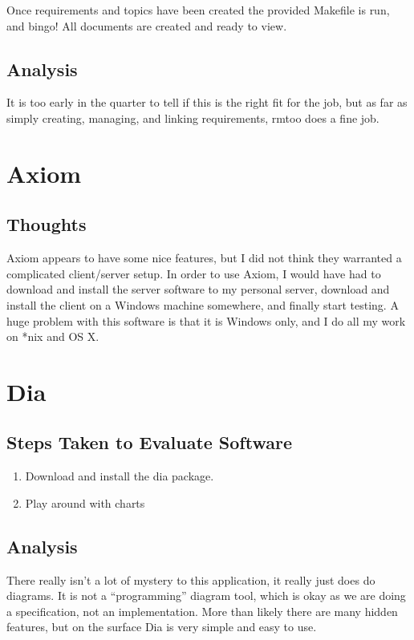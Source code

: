 \documentclass[12pt]{article}
\begin{document}
Once requirements and topics have been created the provided Makefile
is run, and bingo! All documents are created and ready to view.

\subsection{Analysis}
It is too early in the quarter to tell if this is the right fit for
the job, but as far as simply creating, managing, and linking
requirements, rmtoo does a fine job. 

\section{Axiom}

\subsection{Thoughts}
Axiom appears to have some nice features, but I did not think they
warranted a complicated client/server setup. In order to use Axiom, I
would have had to download and install the server software to my
personal server, download and install the client on a Windows machine
somewhere, and finally start testing. A huge problem with this
software is that it is Windows only, and I do all my work on *nix and 
OS X.

\section{Dia}  

\subsection{Steps Taken to Evaluate Software}
\begin{enumerate}
\item Download and install the dia package.
\item Play around with charts
\end{enumerate}

\subsection{Analysis}
There really isn't a lot of mystery to this application, it really
just does do diagrams. It is not a ``programming'' diagram tool, which
is okay as we are doing a specification, not an implementation. More
than likely there are many hidden features, but on the surface Dia is
very simple and easy to use.
\end{document}
